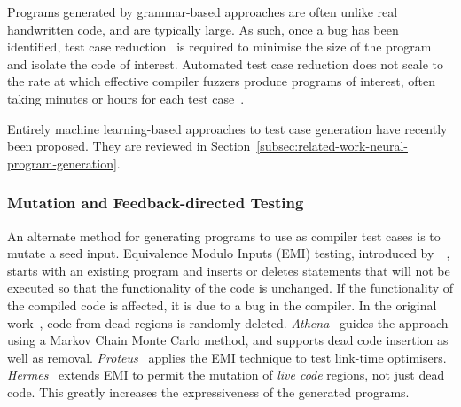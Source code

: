 
Programs generated by grammar-based approaches are often unlike real handwritten code, and are typically large. As such, once a bug has been identified, test case reduction~\cite{Regehr2012a} is required to minimise the size of the program and isolate the code of interest. Automated test case reduction does not scale to the rate at which effective compiler fuzzers produce programs of interest, often taking minutes or hours for each test case~\cite{Pflanzer2016}.

Entirely machine learning-based approaches to test case generation have recently been proposed. They are reviewed in Section~\ref{subsec:related-work-neural-program-generation}.


\subsubsection{Mutation and Feedback-directed Testing}

An alternate method for generating programs to use as compiler test cases is to mutate a seed input.
Equivalence Modulo Inputs (EMI) testing, introduced by~\citeauthor{Le2013a}~\cite{Le2013a}, starts with an existing program and inserts or deletes statements that will not be executed so that the functionality of the code is unchanged. If the functionality of the compiled code is affected, it is due to a bug in the compiler. In the original work~\cite{Le2013a}, code from dead regions is randomly deleted.
\emph{Athena}~\cite{Le2015} guides the approach using a Markov Chain Monte Carlo method, and supports dead code insertion as well as removal.
\emph{Proteus}~\cite{Le2015a} applies the EMI technique to test link-time optimisers.
\emph{Hermes}~\cite{Sun2016a} extends EMI to permit the mutation of \emph{live code} regions, not just dead code. This greatly increases the expressiveness of the generated programs.

